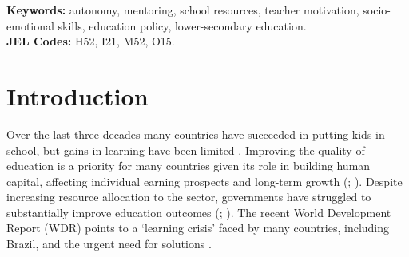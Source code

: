 \documentclass[11pt,a4paper]{article}
\begin{document}
\vspace{1.5em}

\begin{flushleft}
    \textbf{Keywords:}  autonomy, mentoring, school resources, teacher motivation, socio-emotional skills, education policy, lower-secondary education.  \\[1em]
    \textbf{JEL Codes:} H52, I21, M52, O15. \\
\end{flushleft}

\newpage
\sloppy

\doublespacing

\setlength\parskip{1em}
\setlength\parindent{0pt}




\section{Introduction} \label{intro}


Over the last three decades many countries have succeeded in putting kids in school, but gains in learning have been limited \citep{WDR2018}. Improving the quality of education is a priority for many countries given its role in building human capital, affecting individual earning prospects and long-term growth (\citealp{hanushek2008role, hanushek2012better}; \citealp{chetty2014measuringII}). Despite increasing resource allocation to the sector, governments have struggled to substantially improve education outcomes (\citealp{mcewan2015improving}; \citealp{glewwe2016improving}). The recent World Development Report (WDR) points to a `learning crisis' faced by many countries, including Brazil, and the urgent need for solutions \citep{WDR2018}.
\end{document}
